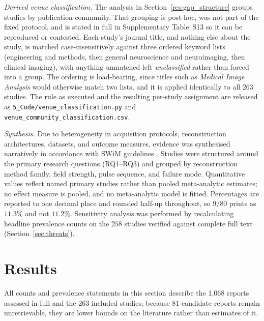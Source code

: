 \documentclass[review,authoryear]{elsarticle}
\begin{document}
\emph{Derived venue classification.} The analysis in
Section~\ref{res:gap_structure} groups studies by publication community. That grouping is
post-hoc, was not part of the fixed protocol, and is stated in full in Supplementary
Table~S13 so it can be reproduced or contested. Each study's journal title, and nothing
else about the study, is matched case-insensitively against three ordered keyword lists (engineering and methods, then general neuroscience and neuroimaging, then clinical imaging), with anything unmatched left \emph{unclassified} rather than forced into a
group. The ordering is load-bearing, since titles such as \emph{Medical Image Analysis}
would otherwise match two lists, and it is applied identically to all $263$ studies. The
rule as executed and the resulting per-study assignment are released as
\texttt{5\_Code/venue\_classification.py} and
\texttt{venue\_community\_classification.csv}.

\emph{Synthesis.} Due to heterogeneity in acquisition protocols, reconstruction
architectures, datasets, and outcome measures, evidence was synthesised narratively in
accordance with SWiM guidelines \citep{swim2020}. Studies were structured around the
primary research questions (RQ1--RQ3) and grouped by reconstruction method family, field
strength, pulse sequence, and failure mode. Quantitative values reflect named primary
studies rather than pooled meta-analytic estimates; no effect measure is pooled, and no
meta-analytic model is fitted. Percentages are reported to one decimal place and
rounded half-up throughout, so $9/80$ prints as $11.3\%$ and not $11.2\%$. Sensitivity
analysis was performed by recalculating headline prevalence counts on the $258$ studies
verified against complete full text (Section~\ref{sec:threats}).

\section{Results}
\label{sec:results}

All counts and prevalence statements in this section describe the 1{,}068 reports
assessed in full and the 263 included studies; because 81 candidate reports remain
unretrievable, they are lower bounds on the literature rather than estimates of
it.
\end{document}
